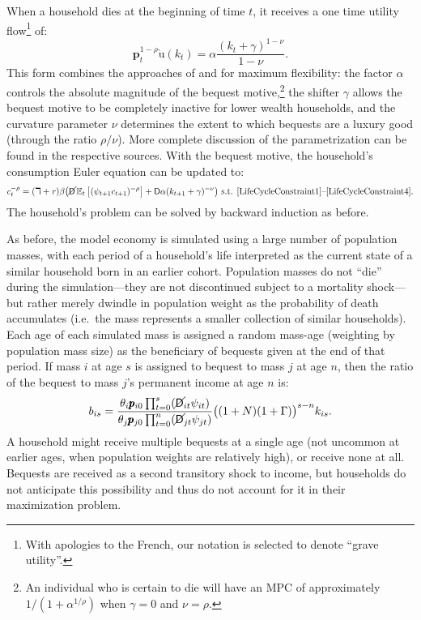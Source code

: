 \documentclass{econtex}\usepackage{graphicx} \usepackage{hyperref} \usepackage{ushort}
\newcommand{\cRat}{\ensuremath{c}}
\newcommand{\CRRA}{\ensuremath{\rho}}
\newcommand{\Discount}{\ensuremath{\beta}}
\newcommand{\kRat}{\ensuremath{k}}
\newcommand{\PDies}{\ensuremath{\mathsf{D}}}
\newcommand{\pLev}{\ensuremath{\pmb{p}}}
\newcommand{\PLives}{\ensuremath{\cancel{\PDies}}}
\newcommand{\pshk}{\psi} %
\newcommand{\rProd}{\ensuremath{\mathit{r}}}
\newcommand{\util}{{\ensuremath{\mathrm{u}}}}
\begin{document}
When a household dies at the beginning of time $t$, it receives a one time utility flow\footnote{With apologies to the French, our notation is selected to denote ``grave utility''.} of:
\begin{equation*}
\pLev_t ^{1-\CRRA}\grave{\util}(\kRat_t) = \alpha \frac{(\kRat_t + \gamma)^{1-\nu}}{1 - \nu}.
\end{equation*}
This form combines the approaches of \cite{Cagetti} and \cite{WhyDoRichSave} for maximum flexibility: the factor $\alpha$ controls the absolute magnitude of the bequest motive,\footnote{An individual who is certain to die will have an MPC of approximately $1/(1 + \alpha^{1/\CRRA})$ when $\gamma = 0$ and $\nu = \CRRA$.} the shifter $\gamma$ allows the bequest motive to be completely inactive for lower wealth households, and the curvature parameter $\nu$ determines the extent to which bequests are a luxury good (through the ratio $\CRRA/\nu$).  More complete discussion of the parametrization can be found in the respective sources.  With the bequest motive, the household's consumption Euler equation can be updated to:
\begin{equation*}
\cRat_t^{-\CRRA} = (\daleth +\rProd) \Discount \big( \PLives \Ex_t \left[ (\pshk_{t+1} \cRat_{t+1})^{-\CRRA} \right] + \PDies \alpha(\kRat_{t+1} + \gamma)^{-\nu}\big) \text{ s.t. \eqref{LifeCycleConstraint1}--\eqref{LifeCycleConstraint4}}.
\end{equation*}
The household's problem can be solved by backward induction as before.

As before, the model economy is simulated using a large number of population masses, with each period of a household's life interpreted as the current state of a similar household born in an earlier cohort.  Population masses do not ``die'' during the simulation---they are not discontinued subject to a mortality shock---but rather merely dwindle in population weight as the probability of death accumulates (i.e.\ the mass represents a smaller collection of similar households).  Each age of each simulated mass is assigned a random mass-age (weighting by population mass size) as the beneficiary of bequests given at the end of that period.  If mass $i$ at age $s$ is assigned to bequest to mass $j$ at age $n$, then the ratio of the bequest to mass $j$'s permanent income at age $n$ is:
\begin{equation}\label{eq:Bequest}
b_{is} = \frac{\theta_i \pLev_{i0} \prod_{t = 0}^s (\PLives_{it} \pshk_{it})}{\theta_j \pLev_{j0} \prod_{t = 0}^n (\PLives_{jt} \pshk_{jt})}\big((1 + N)(1 + \Gamma)\big)^{s - n} \kRat_{is}.
\end{equation}
A household might receive multiple bequests at a single age (not uncommon at earlier ages, when population weights are relatively high), or receive none at all.  Bequests are received as a second transitory shock to income, but households do not anticipate this possibility and thus do not account for it in their maximization problem.
\end{document}
